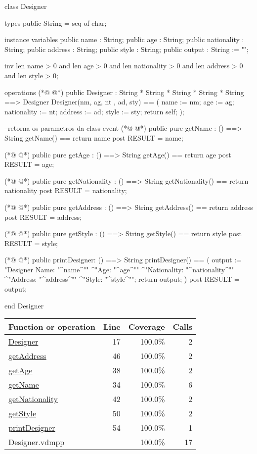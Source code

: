 \begin{vdmpp}[breaklines=true]
class Designer

types
 public String = seq of char;
 
instance variables
 public name : String;
 public age : String;
 public nationality : String;
 public address : String;
 public style : String;
 public output : String := "";
 
inv len name > 0 and len age > 0 and len nationality > 0 and len address > 0 and len style > 0;
 
operations
(*@
\label{Designer:17}
@*)
  public Designer : 
          String * 
          String *
          String * 
          String * 
          String   ==> Designer
  Designer(nm, ag, nt , ad, sty) ==
  (
    name := nm;
    age := ag;
    nationality := nt;
    address := ad;
    style := sty;
    return self;
  );
  
  --retorna os parametros da class event
(*@
\label{getName:34}
@*)
  public pure getName : () ==> String
    getName() == return name
    post RESULT = name;
   
(*@
\label{getAge:38}
@*)
   public pure getAge : () ==> String
     getAge() == return age
    post RESULT = age;
  
(*@
\label{getNationality:42}
@*)
  public pure getNationality : () ==> String
     getNationality() == return nationality
    post RESULT = nationality;
  
(*@
\label{getAddress:46}
@*)
  public pure getAddress : () ==> String
     getAddress() == return address      
    post RESULT = address;   
  
(*@
\label{getStyle:50}
@*)
  public pure getStyle : () ==> String
     getStyle() == return style
    post RESULT = style;
   
(*@
\label{printDesigner:54}
@*)
  public printDesigner: () ==> String
  printDesigner() == (
  output := "Designer Name: "^name^"\n"
       ^"Age: "^age^"\n"
       ^"Nationality: "^nationality^"\n"
       ^"Address: "^address^"\n"
       ^"Style: "^style^"\n";
  return output;
  )
  post RESULT = output;
  
 
     
end Designer
\end{vdmpp}
\bigskip
\begin{longtable}{|l|r|r|r|}
\hline
Function or operation & Line & Coverage & Calls \\
\hline
\hline
\hyperref[Designer:17]{Designer} & 17&100.0\% & 2 \\
\hline
\hyperref[getAddress:46]{getAddress} & 46&100.0\% & 2 \\
\hline
\hyperref[getAge:38]{getAge} & 38&100.0\% & 2 \\
\hline
\hyperref[getName:34]{getName} & 34&100.0\% & 6 \\
\hline
\hyperref[getNationality:42]{getNationality} & 42&100.0\% & 2 \\
\hline
\hyperref[getStyle:50]{getStyle} & 50&100.0\% & 2 \\
\hline
\hyperref[printDesigner:54]{printDesigner} & 54&100.0\% & 1 \\
\hline
\hline
Designer.vdmpp & & 100.0\% & 17 \\
\hline
\end{longtable}

